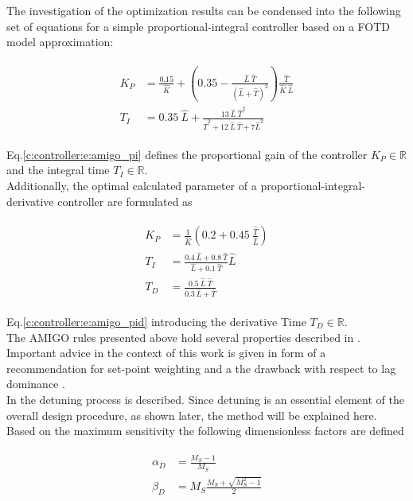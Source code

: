The investigation of the optimization results can be condensed into the following set of equations for a simple proportional-integral controller based on a FOTD model approximation:

\begin{align}
\begin{split}
K_P &= \frac{0.15}{\hat{K}}+ \left(0.35 - \frac{\hat{L}~\hat{T}}{\left( \hat{L}+\hat{T} \right)^2} \right) \frac{\hat{T}}{\hat{K}~\hat{L}} \\
T_I &= 0.35~ \hat{L} + \frac{13~\hat{L}~\hat{T}^2}{\hat{T}^2 + 12~\hat{L}~\hat{T}+7 \hat{L}^2}
\end{split}
\label{c:controller:e:amigo_pi}
\end{align}

Eq.\ref{c:controller:e:amigo_pi} defines the proportional gain of the controller $K_P \in \mathbb{R}$ and the integral time $T_I \in \mathbb{R}$.\\

Additionally, the optimal calculated parameter of a proportional-integral-derivative controller are formulated as

\begin{align}
\begin{split}
K_P &= \frac{1}{\hat{K}} \left( 0.2 + 0.45~ \frac{\hat{T}}{\hat{L}}\right)\\
T_I &= \frac{0.4~\hat{L}+0.8~\hat{T}}{\hat{L}+0.1~\hat{T}}\hat{L}\\
T_D &= \frac{0.5~\hat{L}~\hat{T}}{0.3~\hat{L}+\hat{T}}
\end{split}
\label{c:controller:e:amigo_pid}
\end{align}

Eq.\ref{c:controller:e:amigo_pid} introducing the derivative Time $T_D \in \mathbb{R}$.\\

The AMIGO rules presented above hold several properties described in \cite[p.229 ff.]{Astrom2006}. Important advice in the context of this work is given in form of a recommendation for set-point weighting \cite[p.229 f., p.235 ff.]{Astrom2006} and a the drawback with respect to lag dominance \cite[p.231 ff.]{Astrom2006}.\\ 
In \cite[p.253 ff.]{Astrom2006} the detuning process is described. Since detuning is an essential element of the overall design procedure, as shown later, the method will be explained here. Based on the maximum sensitivity the following dimensionless factors are defined 

\begin{align}
\begin{split}
\alpha_D &= \frac{M_S-1}{M_S}\\
\beta_D &= M_S \frac{M_S+\sqrt{M_S^2 -1}}{2} 
\end{split}
\label{c:controller:e:amigo_factor}
\end{align}

